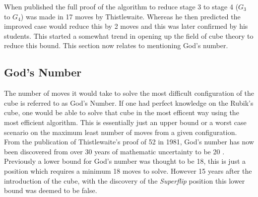\documentclass{article}
\newcounter{theo}[section]\setcounter{theo}{0}
\begin{document}
When published the full proof of the algorithm to reduce stage 3 to stage 4 ($G_3$ to $G_4$) was made in 17 moves by Thistlewaite. Whereas he then predicted the improved case would reduce this by 2 moves and this was later confirmed by his students. This started a somewhat trend in opening up the field of cube theory to reduce this bound. This section now relates to mentioning God's number.

\subsection{God's Number}
The number of moves it would take to solve the most difficult configuration of the cube is referred to as God's Number. If one had perfect knowledge on the Rubik's cube, one would be able to solve that cube in the most efficent way using the most efficient algorithm. This is essentially just an upper bound or a worst case scenario on the maximum least number of moves from a given configuration. From the publication of Thistlewaite's proof of 52 in 1981, God's number has now been discovered from over 30 years of mathematic uncertainty to be 20 \cite{God}. \newline Previously a lower bound for God's number was thought to be 18, this is just a position which requires a minimum 18 moves to solve. However 15 years after the introduction of the cube, with the discovery of the \textit{Superflip} position this lower bound was deemed to be false.
\end{document}
